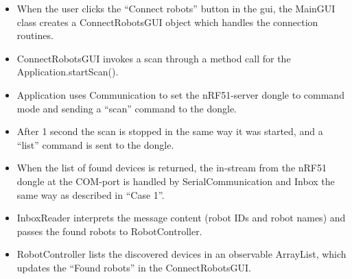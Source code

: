\begin{itemize}
    \item When the user clicks the ``Connect robots'' button in the \acrshort{gui}, the MainGUI class creates a ConnectRobotsGUI object which handles the connection routines.
    \item ConnectRobotsGUI invokes a scan through a method call for the Application.startScan().
    \item Application uses Communication to set the nRF51-server dongle to command mode and sending a ``scan'' command to the dongle.
    \item After 1 second the scan is stopped in the same way it was started, and a ``list'' command is sent to the dongle.
    \item When the list of found devices is returned, the in-stream from the nRF51 dongle at the COM-port is handled by SerialCommunication and Inbox the same way as described in ``Case 1''.
    \item InboxReader interprets the message content (robot IDs and robot names) and passes the found robots to RobotController.
    \item RobotController lists the discovered devices in an observable ArrayList, which updates the ``Found robots'' in the ConnectRobotsGUI.
\end{itemize}
